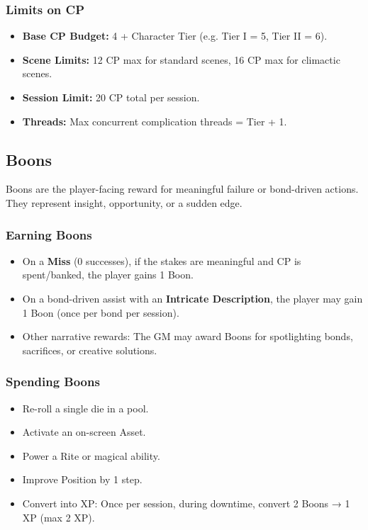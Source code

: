 \subsubsection{Limits on CP}
\begin{itemize}
  \item \textbf{Base CP Budget:} 4 + Character Tier (e.g. Tier I = 5, Tier II = 6).
  \item \textbf{Scene Limits:} 12 CP max for standard scenes, 16 CP max for climactic scenes.
  \item \textbf{Session Limit:} 20 CP total per session.
  \item \textbf{Threads:} Max concurrent complication threads = Tier + 1.
\end{itemize}

\subsection{Boons}
Boons are the player-facing reward for meaningful failure or bond-driven actions. They represent insight, opportunity, or a sudden edge.

\subsubsection{Earning Boons}
\begin{itemize}
  \item On a \textbf{Miss} (0 successes), if the stakes are meaningful and CP is spent/banked, the player gains 1 Boon.
  \item On a bond-driven assist with an \textbf{Intricate Description}, the player may gain 1 Boon (once per bond per session).
  \item Other narrative rewards: The GM may award Boons for spotlighting bonds, sacrifices, or creative solutions.
\end{itemize}

\subsubsection{Spending Boons}
\begin{itemize}
  \item Re-roll a single die in a pool.
  \item Activate an on-screen Asset.
  \item Power a Rite or magical ability.
  \item Improve Position by 1 step.
  \item Convert into XP: Once per session, during downtime, convert 2 Boons → 1 XP (max 2 XP).
\end{itemize}

